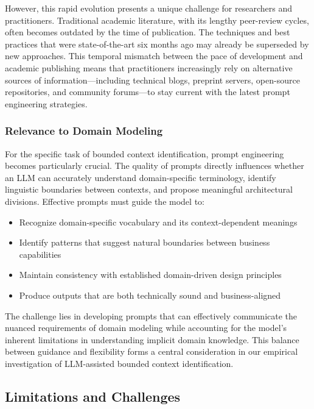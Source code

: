 However, this rapid evolution presents a unique challenge for researchers and practitioners. Traditional academic literature, with its lengthy peer-review cycles, often becomes outdated by the time of publication. The techniques and best practices that were state-of-the-art six months ago may already be superseded by new approaches. This temporal mismatch between the pace of development and academic publishing means that practitioners increasingly rely on alternative sources of information—including technical blogs, preprint servers, open-source repositories, and community forums—to stay current with the latest prompt engineering strategies.

\subsubsection{Relevance to Domain Modeling}
For the specific task of bounded context identification, prompt engineering becomes particularly crucial. The quality of prompts directly influences whether an LLM can accurately understand domain-specific terminology, identify linguistic boundaries between contexts, and propose meaningful architectural divisions. Effective prompts must guide the model to:

\begin{itemize}
    \item Recognize domain-specific vocabulary and its context-dependent meanings
    \item Identify patterns that suggest natural boundaries between business capabilities
    \item Maintain consistency with established domain-driven design principles
    \item Produce outputs that are both technically sound and business-aligned
\end{itemize}

The challenge lies in developing prompts that can effectively communicate the nuanced requirements of domain modeling while accounting for the model's inherent limitations in understanding implicit domain knowledge. This balance between guidance and flexibility forms a central consideration in our empirical investigation of LLM-assisted bounded context identification.

\subsection{Limitations and Challenges}